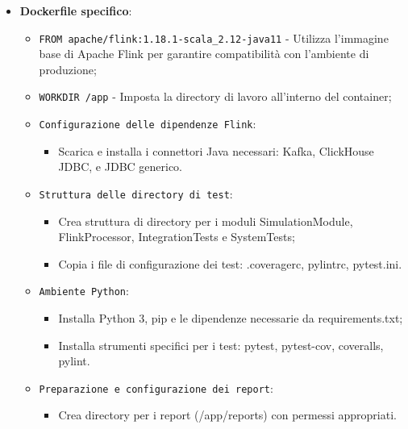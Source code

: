 \documentclass[10pt]{article}
\begin{document}
\begin{itemize}
        \item \textbf{Dockerfile specifico}:
        \begin{itemize}
            \item \texttt{FROM apache/flink:1.18.1-scala\_2.12-java11} - Utilizza l'immagine base di Apache Flink per garantire compatibilità con l'ambiente di produzione;
            \item \texttt{WORKDIR /app} - Imposta la directory di lavoro all'interno del container;
            \item \texttt{Configurazione delle dipendenze Flink}:
            \begin{itemize}
                \item Scarica e installa i connettori Java necessari: Kafka, ClickHouse JDBC, e JDBC generico.
            \end{itemize}
            \item \texttt{Struttura delle directory di test}:
            \begin{itemize}
                \item Crea struttura di directory per i moduli SimulationModule, FlinkProcessor, IntegrationTests e SystemTests;
                \item Copia i file di configurazione dei test: .coveragerc, pylintrc, pytest.ini.
            \end{itemize}
            \item \texttt{Ambiente Python}:
            \begin{itemize}
                \item Installa Python 3, pip e le dipendenze necessarie da requirements.txt;
                \item Installa strumenti specifici per i test: pytest, pytest-cov, coveralls, pylint.
            \end{itemize}
            \item \texttt{Preparazione e configurazione dei report}:
            \begin{itemize}
                \item Crea directory per i report (/app/reports) con permessi appropriati.
            \end{itemize}
        \end{itemize}
        

\end{itemize}
\end{document}
